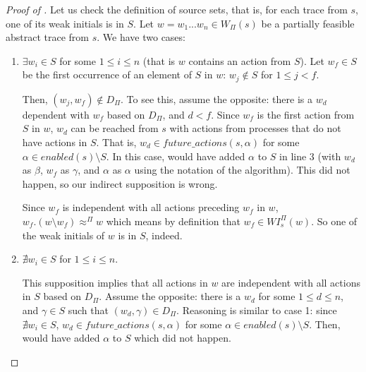 \documentclass[numbook]{svjour3}
\begin{document}
\begin{proof}[Proof of ]
	Let us check the definition of source sets, that is, for each trace from $s$, one of its weak initials is in $S$. Let $w = w_1...w_n \in W_\Pi(s)$ be a partially feasible abstract trace from $s$. We have two cases:
	
	\begin{enumerate}
		\item $\exists w_i \in S$ for some $1 \le i \le n$ (that is $w$ contains an action from $S$). Let $w_f \in S$ be the first occurrence of an element of $S$ in $w$: $w_j \notin S$ for $1 \le j < f$.
		
		Then, $(w_j, w_f) \notin D_\Pi$. To see this, assume the opposite: there is a $w_d$ dependent with $w_f$ based on $D_\Pi$, and $d < f$. Since $w_f$ is the first action from $S$ in $w$, $w_d$ can be reached from $s$ with actions from processes that do not have actions in $S$. That is, $w_d \in \mathit{future\_actions}(s, \alpha)$ for some $\alpha \in \mathit{enabled}(s) \setminus S$. In this case,  would have added $\alpha$ to $S$ in line 3 (with $w_d$ as $\beta$, $w_f$ as $\gamma$, and $\alpha$ as $\alpha$ using the notation of the algorithm). This did not happen, so our indirect supposition is wrong.
		
		Since $w_f$ is independent with all actions preceding $w_f$ in $w$, $w_f.(w \setminus w_f) \approx^\Pi w$ which means by definition that $w_f \in \mathit{WI}_s^\Pi(w)$. So one of the weak initials of $w$ is in $S$, indeed.
		
		\item $\nexists w_i \in S$ for $1 \le i \le n$.
		
		This supposition implies that all actions in $w$ are independent with all actions in $S$ based on $D_\Pi$. Assume the opposite: there is a $w_d$ for some $1 \le d \le n$, and $\gamma \in S$ such that $(w_d, \gamma) \in D_\Pi$. Reasoning is similar to case 1: since $\nexists w_i \in S$, $w_d \in \mathit{future\_actions}(s, \alpha)$ for some $\alpha \in \mathit{enabled}(s) \setminus S$. Then,  would have added $\alpha$ to $S$ which did not happen.
		

\end{enumerate}
\end{proof}
\end{document}
